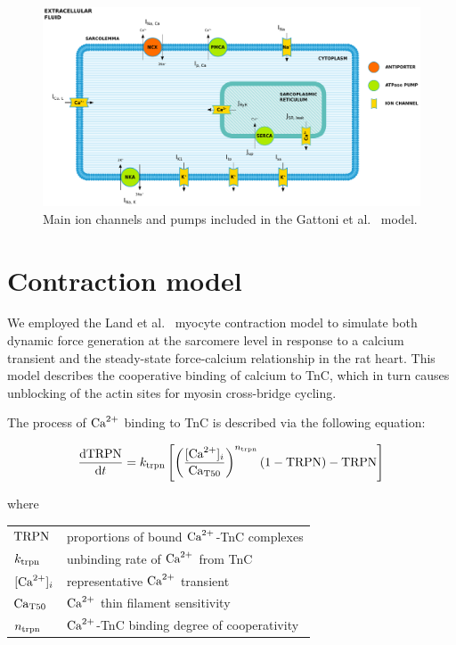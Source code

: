 \begin{figure}[!ht]
    \myfloatalign
    \includegraphics[width=\textwidth]{figures/chapter02/ep.pdf}
    \caption{Main ion channels and pumps included in the Gattoni et al.~\cite{Gattoni:2016} model. }
    \label{fig:gattonicurrentsfig}
\end{figure}


%
%
%
\section{Contraction model}\label{sec:ch2contractionmodel}
We employed the Land et al.~\cite{Land:2012} myocyte contraction model to simulate both dynamic force generation at the sarcomere level in response to a calcium transient and the steady-state force-calcium relationship in the rat heart. This model describes the cooperative binding of calcium to TnC, which in turn causes unblocking of the actin sites for myosin cross-bridge cycling.

\vspace{0.2cm}
The process of $\textrm{Ca}^{2+}$ binding to TnC is described via the following equation:

\begin{equation}\label{eq:landodesys1}
    \dfrac{\mathrm{d}{\textrm{TRPN}}}{\mathrm{d}{t}} = k_{\textrm{trpn}}\left[\left(\frac{[\textrm{Ca}^{2+}]_{i}}{\textrm{Ca}_{\textrm{T}50}}\right)^{n_{\textrm{trpn}}}(1-\textrm{TRPN})-\textrm{TRPN}\right]
\end{equation}

\noindent
where

\vspace{0.2cm}
\begin{tabular}{ll}
    $\textrm{TRPN}$  & proportions of bound $\textrm{Ca}^{2+}$-TnC complexes \\
    $k_{\textrm{trpn}}$ & unbinding rate of $\textrm{Ca}^{2+}$ from TnC \\
    $[\textrm{Ca}^{2+}]_{i}$   & representative $\textrm{Ca}^{2+}$ transient \\
    $\textrm{Ca}_{\textrm{T}50}$ & $\textrm{Ca}^{2+}$ thin filament sensitivity \\
    $n_{\textrm{trpn}}$ & $\textrm{Ca}^{2+}$-TnC binding degree of cooperativity
\end{tabular}

